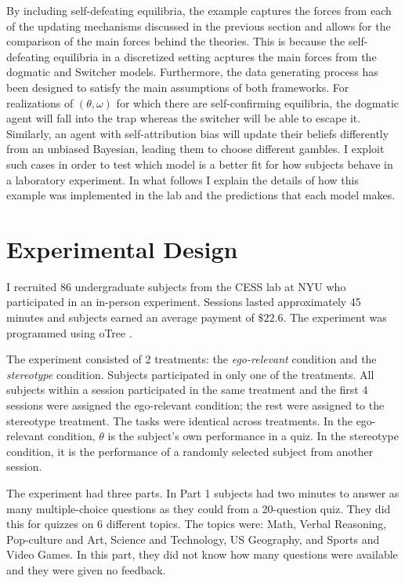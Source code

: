 \documentclass[
  12pt,
]{article}
\begin{document}
By including self-defeating equilibria, the example captures the forces
from each of the updating mechanisms discussed in the previous section
and allows for the comparison of the main forces behind the theories.
This is because the self-defeating equilibria in a discretized setting
acptures the main forces from the dogmatic and Switcher models.
Furthermore, the data generating process has been designed to satisfy
the main assumptions of both frameworks. For realizations of
\((\theta, \omega)\) for which there are self-confirming equilibria, the
dogmatic agent will fall into the trap whereas the switcher will be able
to escape it. Similarly, an agent with self-attribution bias will update
their beliefs differently from an unbiased Bayesian, leading them to
choose different gambles. I exploit such cases in order to test which
model is a better fit for how subjects behave in a laboratory
experiment. In what follows I explain the details of how this example
was implemented in the lab and the predictions that each model makes.

\hypertarget{experimental-design}{%
\section{Experimental Design}\label{experimental-design}}

I recruited 86 undergraduate subjects from the CESS lab at NYU who
participated in an in-person experiment. Sessions lasted approximately
45 minutes and subjects earned an average payment of \(\$22.6\). The
experiment was programmed using oTree \citep{otree}.

The experiment consisted of 2 treatments: the \emph{ego-relevant}
condition and the \emph{stereotype} condition. Subjects participated in
only one of the treatments. All subjects within a session participated
in the same treatment and the first 4 sessions were assigned the
ego-relevant condition; the rest were assigned to the stereotype
treatment. The tasks were identical across treatments. In the
ego-relevant condition, \(\theta\) is the subject's own performance in a
quiz. In the stereotype condition, it is the performance of a randomly
selected subject from another session.

The experiment had three parts. In Part 1 subjects had two minutes to
answer as many multiple-choice questions as they could from a
20-question quiz. They did this for quizzes on 6 different topics. The
topics were: Math, Verbal Reasoning, Pop-culture and Art, Science and
Technology, US Geography, and Sports and Video Games. In this part, they
did not know how many questions were available and they were given no
feedback.
\end{document}
